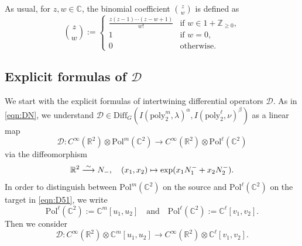 \documentclass[reqno,11pt]{amsart}
\theoremstyle{remark}
\numberwithin{equation}{section}
\newcommand{\ga}{\alpha}
\newcommand{\R}{\mathbb{R}}
\newcommand{\C}{\mathbb{C}}
\newcommand{\Z}{\mathbb{Z}}
\newcommand{\Cal}{\mathcal}
\newcommand{\Pol}{\mathrm{Pol}}
\newcommand{\poly}{\mathrm{poly}}
\newcommand{\To}{\longrightarrow}
\newcommand{\Diff}{\mathrm{Diff}}
\newcommand{\D}{\Cal{D}}
\begin{document}
As usual, for $z, w \in \C$, 
the binomial coefficient $\binom{z}{w}$ is defined as 
\begin{equation*}
\binom{z}{w}:=
\begin{cases}
\frac{z(z-1) \cdots (z-w+1)}{w!} & \text{if $w \in 1+\Z_{\geq 0}$},\\
1 & \text{if $w=0$},\\
0 & \text{otherwise}.
\end{cases}
\end{equation*}

\subsection{Explicit formulas of $\D$}
\label{sec:main2a}
We start with the explicit formulas of intertwining differential operators 
$\D$. As in \eqref{eqn:DN}, 
we understand 
$\D \in 
\Diff_G(I(\poly_2^m, \lambda)^\ga, I(\poly_2^\ell,  \nu)^\beta)$
as a linear map
\begin{equation}\label{eqn:D51}
\D\colon C^\infty(\R^2)\otimes \Pol^m(\C^2) \To 
C^{\infty}(\R^2)\otimes \Pol^\ell(\C^2)
\end{equation}
via the diffeomorphism
\begin{equation}\label{eqn:coord}
\R^2 
\stackrel{\sim}{\To} N_-, \quad (x_1, x_2) 
\mapsto \exp(x_1 N^-_1 +x_2N^-_2).\\[3pt]
\end{equation}
In order to distinguish between $\Pol^m(\C^2)$ on the source
and $\Pol^\ell(\C^2)$ on the target in \eqref{eqn:D51}, we write
\begin{equation*}
\Pol^\ell(\C^2):=\C^m[u_1,u_2]
\quad
\text{and}
\quad
\Pol^\ell(\C^2):=\C^\ell[v_1,v_2].
\end{equation*}
Then we consider
\begin{equation}\label{eqn:D51a}
\D\colon C^\infty(\R^2)\otimes \C^m[u_1, u_2] \To 
C^{\infty}(\R^2)\otimes \C^\ell[v_1, v_2].
\end{equation}
\end{document}
